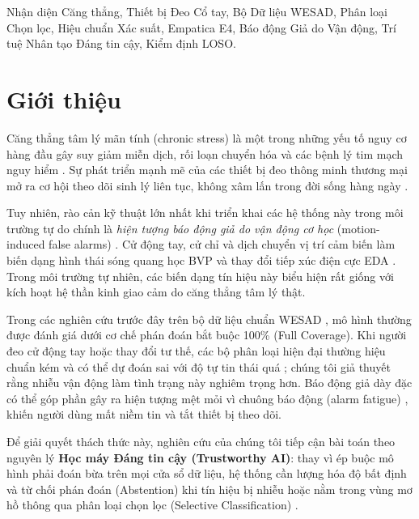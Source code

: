 \documentclass[conference]{IEEEtran}
\begin{document}
\begin{IEEEkeywords}
Nhận diện Căng thẳng, Thiết bị Đeo Cổ tay, Bộ Dữ liệu WESAD, Phân loại Chọn lọc, Hiệu chuẩn Xác suất, Empatica E4, Báo động Giả do Vận động, Trí tuệ Nhân tạo Đáng tin cậy, Kiểm định LOSO.
\end{IEEEkeywords}

\section{Giới thiệu}
Căng thẳng tâm lý mãn tính (chronic stress) là một trong những yếu tố nguy cơ hàng đầu gây suy giảm miễn dịch, rối loạn chuyển hóa và các bệnh lý tim mạch nguy hiểm \cite{cohen2007psychological, schneiderman2005stress, can2019stress}. Sự phát triển mạnh mẽ của các thiết bị đeo thông minh thương mại mở ra cơ hội theo dõi sinh lý liên tục, không xâm lấn trong đời sống hàng ngày \cite{gjoreski2016continuous, schmidt2018wesad, sano2015recognizing}.

Tuy nhiên, rào cản kỹ thuật lớn nhất khi triển khai các hệ thống này trong môi trường tự do chính là \textit{hiện tượng báo động giả do vận động cơ học} (motion-induced false alarms) \cite{schumm2008effect, tamura2014wearable, zhang2014troika}. Cử động tay, cử chỉ và dịch chuyển vị trí cảm biến làm biến dạng hình thái sóng quang học BVP và thay đổi tiếp xúc điện cực EDA \cite{boucsein2012electrodermal}. Trong môi trường tự nhiên, các biến dạng tín hiệu này biểu hiện rất giống với kích hoạt hệ thần kinh giao cảm do căng thẳng tâm lý thật.

Trong các nghiên cứu trước đây trên bộ dữ liệu chuẩn WESAD \cite{schmidt2018wesad, bobade2020stress, dalmeida2021hrv, behinaein2021transformer}, mô hình thường được đánh giá dưới cơ chế phán đoán bắt buộc 100\% (Full Coverage). Khi người đeo cử động tay hoặc thay đổi tư thế, các bộ phân loại hiện đại thường hiệu chuẩn kém và có thể dự đoán sai với độ tự tin thái quá \cite{guo2017calibration}; chúng tôi giả thuyết rằng nhiễu vận động làm tình trạng này nghiêm trọng hơn. Báo động giả dày đặc có thể góp phần gây ra hiện tượng mệt mỏi vì chuông báo động (alarm fatigue) \cite{sendelbach2013alarm}, khiến người dùng mất niềm tin và tắt thiết bị theo dõi.

Để giải quyết thách thức này, nghiên cứu của chúng tôi tiếp cận bài toán theo nguyên lý \textbf{Học máy Đáng tin cậy (Trustworthy AI)}: thay vì ép buộc mô hình phải đoán bừa trên mọi cửa sổ dữ liệu, hệ thống cần lượng hóa độ bất định và từ chối phán đoán (Abstention) khi tín hiệu bị nhiễu hoặc nằm trong vùng mơ hồ thông qua phân loại chọn lọc (Selective Classification) \cite{chow1970optimum, cortes2016learning, geifman2017selective, geifman2019selectivenet, grandvalet2008support, hendrickx2024machine}.
\end{document}
